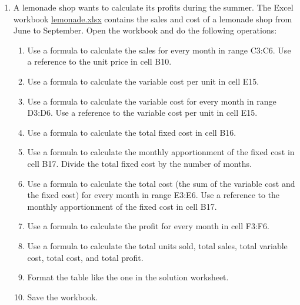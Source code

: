 \begin{enumerate}[leftmargin=*,resume]
\item \label{lemmonade}A lemonade shop wants to calculate its profits during the summer.
The Excel workbook \href{http://aprendeconalf.es/office/excel/exercises/formulas/lemonade.xlsx}{\textsf{lemonade.xlsx}}
contains the sales and cost of a lemonade shop from June to September.
Open the workbook and do the following operations:
\begin{enumerate}
\item Use a formula to calculate the sales for every month in range C3:C6.
Use a reference to the unit price in cell B10. 
\item Use a formula to calculate the variable cost per unit in cell E15. 
\item Use a formula to calculate the variable cost for every month in range D3:D6.
Use a reference to the variable cost per unit in cell E15. 
\item Use a formula to calculate the total fixed cost in cell B16.
\item Use a formula to calculate the monthly apportionment of the fixed cost in cell B17.  
Divide the total fixed cost by the number of months.  
\item Use a formula to calculate the total cost (the sum of the variable cost and the fixed cost) for every month in
range E3:E6.
Use a reference to the monthly apportionment of the fixed cost in cell B17. 
\item Use a formula to calculate the profit for every month in cell F3:F6. 
\item Use a formula to calculate the total units sold, total sales, total variable cost, total cost, and total profit. 
\item Format the table like the one in the solution worksheet. 
\item Save the workbook. 
\end{enumerate}



\end{enumerate}
